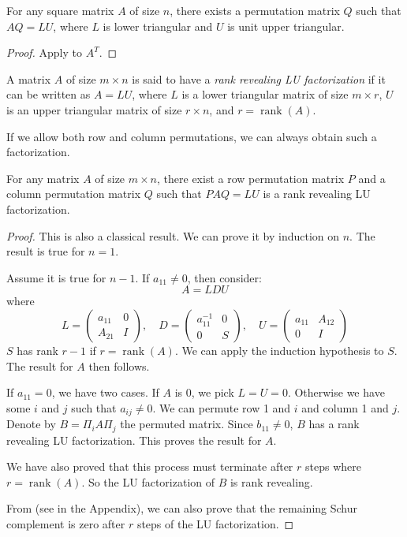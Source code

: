 \documentclass[10pt,twoside]{siamart1116}
\DeclareMathOperator{\rk}{rank}
\newcommand{\by}{\times}
\numberwithin{theorem}{section}
\begin{document}
\begin{corollary}\label{cor:col_permutation}
	For any square matrix $A$ of size $n$, there exists a permutation matrix $Q$ such that $AQ = LU$, where $L$ is lower triangular and $U$ is unit upper triangular.
\end{corollary}

\begin{proof}
	Apply  to $A^T$.
\end{proof}

\begin{definition}\label{def:rank_revealing}
	A matrix $A$ of size $m \by n$ is said to have a \emph{rank revealing LU factorization} if it can be written as $A = LU$, where $L$ is a lower triangular matrix of size $m \by r$, $U$ is an upper triangular matrix of size $r \by n$, and $r = \rk(A)$.
\end{definition}

If we allow both row and column permutations, we can always obtain such a factorization.

\begin{theorem}\label{thm:row_column_permutation}
	For any matrix $A$ of size $m \by n$, there exist a row permutation matrix $P$ and a column permutation matrix $Q$ such that $PAQ = LU$ is a rank revealing LU factorization.
\end{theorem}

\begin{proof}
	This is also a classical result. We can prove it by induction on $n$. The result is true for $n=1$.

	Assume it is true for $n-1$. If $a_{11} \neq 0$, then consider:
	\[
		A = LDU
	\]
	where
	\[
		L = \begin{pmatrix}
			a_{11} & 0 \\
			A_{21} & I
		\end{pmatrix}, \quad
		D = \begin{pmatrix}
			a_{11}^{-1} & 0 \\
			0           & S
		\end{pmatrix}, \quad
		U = \begin{pmatrix}
			a_{11} & A_{12} \\
			0      & I
		\end{pmatrix}
	\]
	$S$ has rank $r-1$ if $r = \rk(A)$. We can apply the induction hypothesis to $S$. The result for $A$ then follows.

	If $a_{11} = 0$, we have two cases. If $A$ is 0, we pick $L=U=0$. Otherwise we have some $i$ and $j$ such that $a_{ij} \neq 0$. We can permute row 1 and $i$ and column 1 and $j$. Denote by $B = \Pi_i A \Pi_j$ the permuted matrix. Since $b_{11} \neq 0$, $B$ has a rank revealing LU factorization. This proves the result for $A$.

	We have also proved that this process must terminate after $r$ steps where $r = \rk(A)$. So the LU factorization of $B$ is rank revealing.

	From  (see  in the Appendix), we can also prove that the remaining Schur complement is zero after $r$ steps of the LU factorization.
\end{proof}
\end{document}
